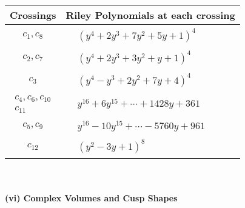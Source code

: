 \documentclass[1p]{elsarticle_modified}
\theoremstyle{definition}
\begin{document}
\begin{tabular}{m{50pt}|m{274pt}}
Crossings & \hspace{64pt}Riley Polynomials at each crossing \\
\hline $$\begin{aligned}c_{1},c_{8}\end{aligned}$$&$\begin{aligned}
&(y^4+2 y^3+7 y^2+5 y+1)^4
\end{aligned}$\\
\hline $$\begin{aligned}c_{2},c_{7}\end{aligned}$$&$\begin{aligned}
&(y^4+2 y^3+3 y^2+y+1)^4
\end{aligned}$\\
\hline $$\begin{aligned}c_{3}\end{aligned}$$&$\begin{aligned}
&(y^4- y^3+2 y^2+7 y+4)^4
\end{aligned}$\\
\hline $$\begin{aligned}c_{4},c_{6},c_{10}\\c_{11}\end{aligned}$$&$\begin{aligned}
&y^{16}+6 y^{15}+\cdots+1428 y+361
\end{aligned}$\\
\hline $$\begin{aligned}c_{5},c_{9}\end{aligned}$$&$\begin{aligned}
&y^{16}-10 y^{15}+\cdots-5760 y+961
\end{aligned}$\\
\hline $$\begin{aligned}c_{12}\end{aligned}$$&$\begin{aligned}
&(y^2-3 y+1)^8
\end{aligned}$\\
\hline
\end{tabular}\\~\\
\newpage\flushleft \textbf{(vi) Complex Volumes and Cusp Shapes}
\end{document}
